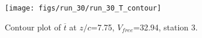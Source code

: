 \begin{figure}[H]
\centering
\texttt{[image: figs/run\_30/run\_30\_T\_contour]}
\caption{Contour plot of $\overline{t}$ at $z/c$=7.75, $V_{free}$=32.94, station 3.}
\label{fig:run_30_T_contour}
\end{figure}


